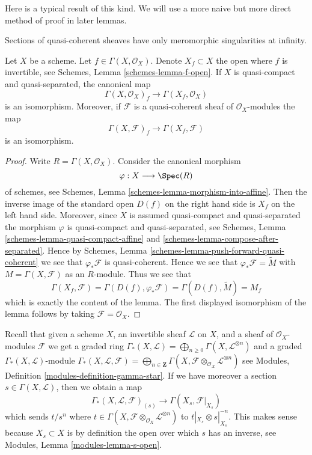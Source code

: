 \noindent
Here is a typical result of this kind. We will use a more naive but
more direct method of proof in later lemmas.

\begin{lemma}
\label{lemma-invert-f-sections}
\begin{slogan}
Sections of quasi-coherent sheaves have only meromorphic singularities
at infinity.
\end{slogan}
Let $X$ be a scheme. Let $f \in \Gamma(X, \mathcal{O}_X)$.
Denote $X_f \subset X$ the open where $f$ is invertible, see
Schemes, Lemma \ref{schemes-lemma-f-open}.
If $X$ is quasi-compact and quasi-separated, the canonical map
$$
\Gamma(X, \mathcal{O}_X)_f \longrightarrow \Gamma(X_f, \mathcal{O}_X)
$$
is an isomorphism. Moreover, if $\mathcal{F}$ is a quasi-coherent
sheaf of $\mathcal{O}_X$-modules the map
$$
\Gamma(X, \mathcal{F})_f \longrightarrow \Gamma(X_f, \mathcal{F})
$$
is an isomorphism.
\end{lemma}

\begin{proof}
Write $R = \Gamma(X, \mathcal{O}_X)$. Consider the canonical morphism
$$
\varphi : X \longrightarrow \Spec(R)
$$
of schemes, see
Schemes, Lemma
\ref{schemes-lemma-morphism-into-affine}.
Then the inverse image of the standard open $D(f)$ on the
right hand side is $X_f$ on the left hand side.
Moreover, since $X$ is assumed quasi-compact and quasi-separated
the morphism $\varphi$ is quasi-compact and quasi-separated,
see Schemes, Lemma \ref{schemes-lemma-quasi-compact-affine} and
\ref{schemes-lemma-compose-after-separated}. Hence by
Schemes, Lemma \ref{schemes-lemma-push-forward-quasi-coherent}
we see that $\varphi_*\mathcal{F}$ is quasi-coherent.
Hence we see that $\varphi_*\mathcal{F} = \widetilde M$
with $M = \Gamma(X, \mathcal{F})$ as an $R$-module.
Thus we see that
$$
\Gamma(X_f, \mathcal{F}) =
\Gamma(D(f), \varphi_*\mathcal{F}) =
\Gamma(D(f), \widetilde M) = M_f
$$
which is exactly the content of the lemma. The first displayed isomorphism
of the lemma follows by taking $\mathcal{F} = \mathcal{O}_X$.
\end{proof}

\noindent
Recall that given a scheme $X$, an invertible sheaf $\mathcal{L}$
on $X$, and a sheaf of $\mathcal{O}_X$-modules $\mathcal{F}$
we get a graded ring
$\Gamma_*(X, \mathcal{L}) =
\bigoplus\nolimits_{n \geq 0} \Gamma(X, \mathcal{L}^{\otimes n})$
and a graded $\Gamma_*(X, \mathcal{L})$-module
$\Gamma_*(X, \mathcal{L}, \mathcal{F}) =
\bigoplus\nolimits_{n \in \mathbf{Z}}
\Gamma(X, \mathcal{F} \otimes_{\mathcal{O}_X} \mathcal{L}^{\otimes n})$
see Modules, Definition \ref{modules-definition-gamma-star}.
If we have moreover a section $s \in \Gamma(X, \mathcal{L})$, then
we obtain a map
\begin{equation}
\label{equation-module-invert-s}
\Gamma_*(X, \mathcal{L}, \mathcal{F})_{(s)}
\longrightarrow
\Gamma(X_s, \mathcal{F}|_{X_s})
\end{equation}
which sends $t/s^n$ where
$t \in \Gamma(X, \mathcal{F} \otimes_{\mathcal{O}_X} \mathcal{L}^{\otimes n})$
to $t|_{X_s} \otimes s|_{X_s}^{-n}$. This makes sense
because $X_s \subset X$ is by definition the open over which
$s$ has an inverse, see Modules, Lemma \ref{modules-lemma-s-open}.

